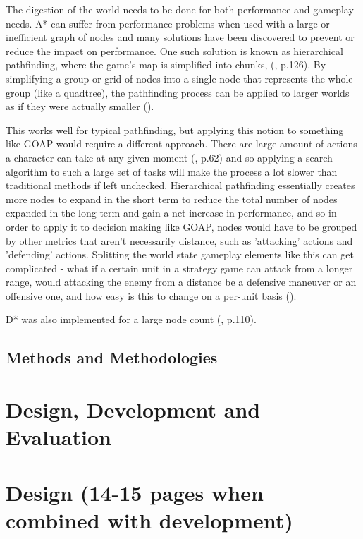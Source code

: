 \documentclass[10pt]{article}
\begin{document}
The digestion of the world needs to be done for both performance and gameplay needs. A* can suffer from performance problems when used with a large or inefficient graph of nodes and many solutions have been discovered to prevent or reduce the impact on performance. One such solution is known as hierarchical pathfinding, where the game's map is simplified into chunks, (\cite{cui2011based}, p.126). By simplifying a group or grid of nodes into a single node that represents the whole group (like a quadtree), the pathfinding process can be applied to larger worlds as if they were actually smaller (\cite{botea2004near}). 

This works well for typical pathfinding, but applying this notion to something like GOAP would require a different approach. There are large amount of actions a character can take at any given moment (\cite{nareyek2004ai}, p.62) and so applying a search algorithm to such a large set of tasks will make the process a lot slower than traditional methods if left unchecked. Hierarchical pathfinding essentially creates more nodes to expand in the short term to reduce the total number of nodes expanded in the long term and gain a net increase in performance, and so in order to apply it to decision making like GOAP, nodes would have to be grouped by other metrics that aren't necessarily distance, such as 'attacking' actions and 'defending' actions. Splitting the world state gameplay elements like this can get complicated - what if a certain unit in a strategy game can attack from a longer range, would attacking the enemy from a distance be a defensive maneuver or an offensive one, and how easy is this to change on a per-unit basis (\cite{weber2011building}).

D* was also implemented for a large node count (\cite{stentz1996map}, p.110).





\subsection{Methods and Methodologies}

\section {Design, Development and Evaluation}

\section{Design (14-15 pages when combined with development)}
\end{document}
